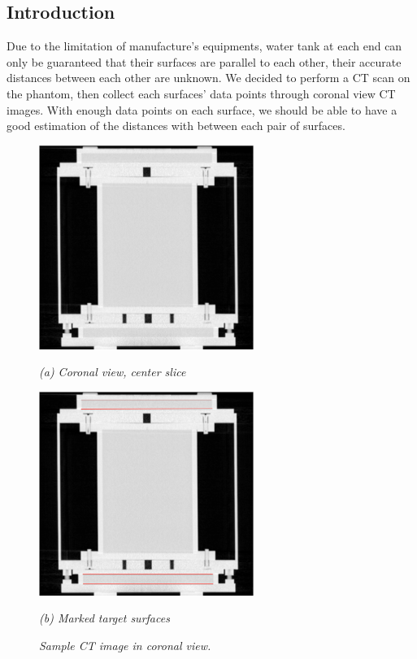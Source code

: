 
\subsection{Introduction}
Due to the limitation of manufacture's equipments, water tank at each end can only be guaranteed that their
surfaces are parallel %
to each other, their accurate distances between each other
are unknown. We decided to perform a CT scan%
on the phantom, then collect each
surfaces' data points through coronal view CT images. With enough data points on each surface, we should be
able to have a good estimation of the distances with between each pair of surfaces. %
\\

\begin{figure}[htb]
  \begin{minipage}[b]{2.75in}
    \centering
    \centerline{\mbox{\includegraphics[width=2.75in]{data_extraction/images/targets/ct_coronal_mid_slice.eps}}}
    \centerline{\emph{(a) Coronal view, center slice}}
  \end{minipage}
  \begin{minipage}[b]{2.75in}
    \centering
    \centerline{\mbox{\includegraphics[width=2.75in]{data_extraction/images/targets/ct_coronal_mid_slice_marked_surface.eps}}}
    \centerline{\emph{(b) Marked target surfaces}}
  \end{minipage}
  \caption{\emph{Sample CT image in coronal view.}}
  \label{fig:ct_sample_coronal}
\end{figure}


